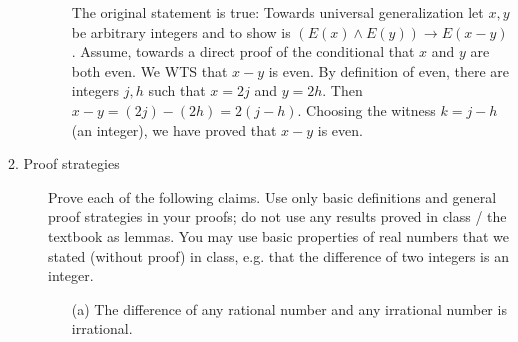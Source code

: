 \begin{description}
\begin{enumerate}
{  The original statement is true: Towards universal generalization let $x,y$ be arbitrary integers and
  to show is $( E(x) \wedge E(y) ) \to E(x-y)$. Assume, towards
  a direct proof of the conditional that $x$ and $y$ are both even. We WTS that $x-y$ is even.  By definition of even, 
  there are integers $j, h$ such that $x=2j$ and $y=2h$.  Then $x-y = (2j) - (2h) = 2(j-h)$.
  Choosing the  witness $k=j-h$ (an integer), we have proved that $x - y$ is even.
  }
  \else{}
  \fi
  \end{enumerate}
  
  
  \item[2. Proof strategies] Prove each of the following claims.
  Use only basic definitions and general proof strategies in your proofs; 
  do not use any results proved in class / the textbook as lemmas. You may use basic 
  properties of real numbers that we stated (without proof) in class, e.g. that the difference of two
  integers is an integer.
  \begin{enumerate}
  \item[(a)] The difference of any rational number and any irrational number is irrational.
  
  \ifsolution
\end{enumerate}
\end{description}
